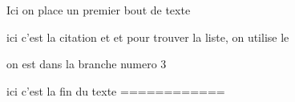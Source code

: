 \documentclass{sn-jnl}%
\begin{document}
Ici on place un premier bout de texte

	ici c'est la citation \cite{armstrong_simple_2011} et \cite{guttenberger_rapid_2000} et pour trouver la liste, on utilise le \cite{aneja_experiments_2003}

on est dans la branche numero 3

ici c'est la fin du texte
============%

\end{document}
